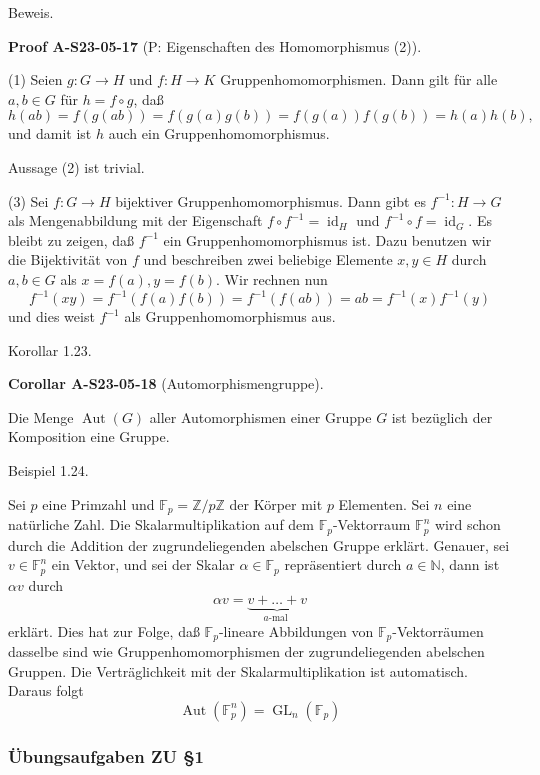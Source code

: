 \documentclass[10pt, letterpaper]{article}
\newcommand{\CustomHeading}[3]{%
  \par\medskip\noindent%
  \textbf{#1 #2} \textnormal{(#3)}.\enskip%
}
\newenvironment{KORO}[2]{\begin{unitbox}\CustomHeading{Corollar}{#1}{#2}}{\end{unitbox}}
\newenvironment{PROOF}[2]{\begin{unitbox}\CustomHeading{Proof}{#1}{#2}}{\end{unitbox}}
\begin{document}
Beweis. 

\begin{PROOF}{A-S23-05-17}{P: Eigenschaften des Homomorphismus (2)}
(1) Seien $g: G \rightarrow H$ und $f: H \rightarrow K$ Gruppenhomomorphismen. Dann gilt für alle $a, b \in G$ für $h=f \circ g$, daß
$$
h(a b)=f(g(a b))=f(g(a) g(b))=f(g(a)) f(g(b))=h(a) h(b),
$$
und damit ist $h$ auch ein Gruppenhomomorphismus.

Aussage (2) ist trivial.

(3) Sei $f: G \rightarrow H$ bijektiver Gruppenhomomorphismus. Dann gibt es $f^{-1}: H \rightarrow G$ als Mengenabbildung mit der Eigenschaft $f \circ f^{-1}=\operatorname{id}_{H}$ und $f^{-1} \circ f=\operatorname{id}_{G}$. Es bleibt zu zeigen, daß $f^{-1}$ ein Gruppenhomomorphismus ist. Dazu benutzen wir die Bijektivität von $f$ und beschreiben zwei beliebige Elemente $x, y \in H$ durch $a, b \in G$ als $x=f(a), y=f(b)$. Wir rechnen nun
$$
f^{-1}(x y)=f^{-1}(f(a) f(b))=f^{-1}(f(a b))=a b=f^{-1}(x) f^{-1}(y)
$$
und dies weist $f^{-1}$ als Gruppenhomomorphismus aus.
\end{PROOF}


Korollar 1.23. 

\begin{KORO}{A-S23-05-18}{Automorphismengruppe}
Die Menge $\operatorname{Aut}(G)$ aller Automorphismen einer Gruppe $G$ ist bezüglich der Komposition eine Gruppe.
\end{KORO}


Beispiel 1.24. 

Sei $p$ eine Primzahl und $\mathbb{F}_{p}=\mathbb{Z} / p \mathbb{Z}$ der Körper mit $p$ Elementen. Sei $n$ eine natürliche Zahl. Die Skalarmultiplikation auf dem $\mathbb{F}_{p}$-Vektorraum $\mathbb{F}_{p}^{n}$ wird schon durch die Addition der zugrundeliegenden abelschen Gruppe erklärt. Genauer, sei $v \in \mathbb{F}_{p}^{n}$ ein Vektor, und sei der Skalar $\alpha \in \mathbb{F}_{p}$ repräsentiert durch $a \in \mathbb{N}$, dann ist $\alpha v$ durch
$$
\alpha v=\underbrace{v+\ldots+v}_{a \text {-mal }}
$$
erklärt. Dies hat zur Folge, daß $\mathbb{F}_{p}$-lineare Abbildungen von $\mathbb{F}_{p}$-Vektorräumen dasselbe sind wie Gruppenhomomorphismen der zugrundeliegenden abelschen Gruppen. Die Verträglichkeit mit der Skalarmultiplikation ist automatisch. Daraus folgt
$$
\operatorname{Aut}\left(\mathbb{F}_{p}^{n}\right)=\operatorname{GL}_{n}\left(\mathbb{F}_{p}\right)
$$



\subsubsection{Übungsaufgaben ZU §1}
\end{document}
